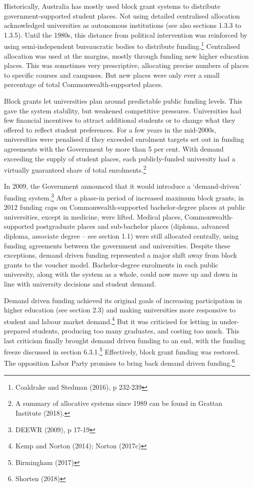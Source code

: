 \documentclass[]{book}
\begin{document}
Historically, Australia has mostly used block grant systems to distribute government-supported student places. Not using detailed centralised allocation acknowledged universities as autonomous institutions (see also sections 1.3.3 to 1.3.5). Until the 1980s, this distance from political intervention was reinforced by using semi-independent bureaucratic bodies to distribute funding.\footnote{Coaldrake and Stedman (2016), p 232-239} Centralised allocation was used at the margins, mostly through funding new higher education places. This was sometimes very prescriptive, allocating precise numbers of places to specific courses and campuses. But new places were only ever a small percentage of total Commonwealth-supported places.

Block grants let universities plan around predictable public funding levels. This gave the system stability, but weakened competitive pressures. Universities had few financial incentives to attract additional students or to change what they offered to reflect student preferences. For a few years in the mid-2000s, universities were penalised if they exceeded enrolment targets set out in funding agreements with the Government by more than 5 per cent. With demand exceeding the supply of student places, each publicly-funded university had a virtually guaranteed share of total enrolments.\footnote{A summary of allocative systems since 1989 can be found in Grattan Institute (2018).}

In 2009, the Government announced that it would introduce a `demand-driven' funding system.\footnote{DEEWR (2009), p 17-19} After a phase-in period of increased maximum block grants, in 2012 funding caps on Commonwealth-supported bachelor-degree places at public universities, except in medicine, were lifted. Medical places, Commonwealth-supported postgraduate places and sub-bachelor places (diploma, advanced diploma, associate degree -- see section 1.1) were still allocated centrally, using funding agreements between the government and universities. Despite these exceptions, demand driven funding represented a major shift away from block grants to the voucher model. Bachelor-degree enrolments in each public university, along with the system as a whole, could now move up and down in line with university decisions and student demand.

Demand driven funding achieved its original goals of increasing participation in higher education (see section 2.3) and making universities more responsive to student and labour market demand.\footnote{Kemp and Norton (2014); Norton (2017c)} But it was criticised for letting in under-prepared students, producing too many graduates, and costing too much. This last criticism finally brought demand driven funding to an end, with the funding freeze discussed in section 6.3.1.\footnote{Birmingham (2017)} Effectively, block grant funding was restored. The opposition Labor Party promises to bring back demand driven funding.\footnote{Shorten (2018)}
\end{document}
